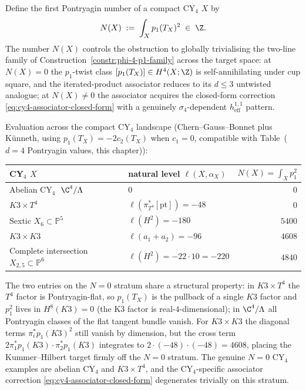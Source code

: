 \begin{remark}[The first Pontryagin number \texorpdfstring{$N(X)$}{N(X)} and the \texorpdfstring{$N=0$}{N=0} stratum of the CY\texorpdfstring{${}_4$}{-4} landscape]
\label{rem:cy4-pontryagin-number-stratum}
Define the first Pontryagin number of a compact CY${}_4$ $X$ by
\[
 N(X) \;:=\; \int_X p_1(T_X)^2 \;\in\; \Z.
\]
The number \(N(X)\) controls the obstruction to globally trivialising the
two-line family of Construction~\ref{constr:phi-4-p1-family}
across the target space: at \(N(X)=0\) the \(p_1\)-twist class
$[p_1(T_X)] \in H^4(X; \Z)$ is self-annihilating under cup square, and the
iterated-product associator reduces to its $d \leq 3$ untwisted analogue; at
$N(X) \neq 0$ the associator acquires the closed-form correction
\eqref{eq:cy4-associator-closed-form} with a genuinely $\sigma_4$-dependent
$h^{1,1}_{\mathrm{eff}}$ pattern.

Evaluation across the compact CY${}_4$ landscape (Chern--Gauss--Bonnet plus
Künneth, using $p_1(T_X) = -2 c_2(T_X)$ when $c_1 = 0$, compatible with
Table~\textup{(}$d = 4$ Pontryagin values, this chapter\textup{)}):
\begin{center}
\renewcommand{\arraystretch}{1.3}
\begin{tabular}{llr}
 \toprule
 CY${}_4$ $X$ & natural level $\ell(X,\alpha_X)$ & $N(X) = \int_X p_1^2$ \\
 \midrule
 Abelian CY${}_4$ $\;\C^4/\Lambda$ & $0$ & $0$ \\
 $K3 \times T^4$ & $\ell(\pi_{T^4}^*[\mathrm{pt}])=-48$ & $0$ \\
 Sextic $X_6 \subset \mathbb{P}^5$ & $\ell(H^2)=-180$ & $5400$ \\
 $K3 \times K3$ & $\ell(a_1+a_2)=-96$ & $4608$ \\
 Complete intersection \(X_{2,5}\subset\mathbb P^6\) & \(\ell(H^2)=-22\cdot10=-220\) & \(4840\) \\
 \bottomrule
\end{tabular}
\end{center}
The two entries on the $N = 0$ stratum share a structural property: in
$K3 \times T^4$ the $T^4$ factor is Pontryagin-flat, so $p_1(T_X)$ is the
pullback of a single $K3$ factor and $p_1^2$ lives in $H^8(K3) = 0$ (the
K3 factor is real-$4$-dimensional); in $\C^4/\Lambda$ all Pontryagin classes
of the flat tangent bundle vanish. For $K3 \times K3$ the diagonal terms
$\pi_i^* p_1(K3)^2$ still vanish by dimension, but the cross term
$2 \pi_1^* p_1(K3) \cdot \pi_2^* p_1(K3)$ integrates to
$2 \cdot (-48) \cdot (-48) = 4608$, placing the Kummer--Hilbert target
firmly off the $N = 0$ stratum. The genuine $N = 0$ CY${}_4$ examples are
abelian CY${}_4$ and $K3 \times T^4$, and the CY${}_4$-specific associator
correction \eqref{eq:cy4-associator-closed-form} degenerates trivially on
this stratum.
\end{remark}

